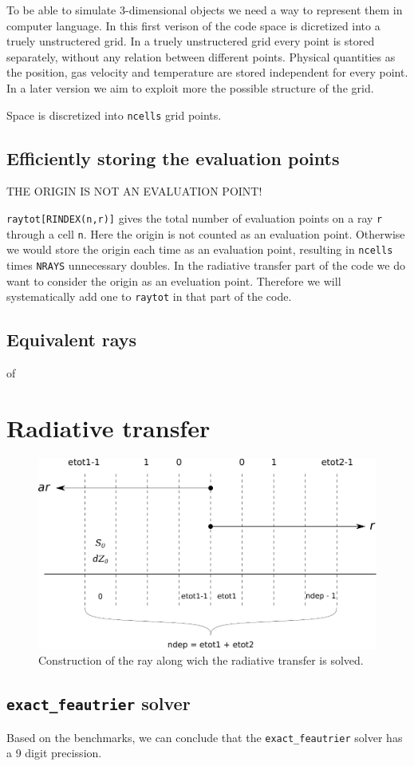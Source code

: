 \documentclass[]{article}
\begin{document}
To be able to simulate 3-dimensional objects we need a way to represent them in computer language. In this first verison of the code space is dicretized into a truely unstructered grid. In a truely unstructered grid every point is stored separately, without any relation between different points. Physical quantities as the position, gas velocity and temperature are stored independent for every point. In a later version we aim to exploit more the possible structure of the grid.

\bigskip

Space is discretized into \texttt{ncells} grid points.

\subsection{Efficiently storing the evaluation points}

THE ORIGIN IS NOT AN EVALUATION POINT!

\texttt{raytot[RINDEX(n,r)]} gives the total number of evaluation points on a ray \texttt{r} through a cell \texttt{n}. Here the origin is not counted as an evaluation point. Otherwise we would store the origin each time as an evaluation point, resulting in \texttt{ncells} times \texttt{NRAYS} unnecessary doubles. In the radiative transfer part of the code we do want to consider the origin as an eveluation point. Therefore we will systematically add one to \texttt{raytot} in that part of the code.

\subsection{Equivalent rays}
of

\section{Radiative transfer}

\begin{figure}[H]
	\centering
	\includegraphics[scale=.8]{Images/ray.pdf}
	\caption{Construction of the ray along wich the radiative transfer is solved.}
	\label{grid}
\end{figure}


\subsection{\texttt{exact\_feautrier} solver}

Based on the benchmarks, we can conclude that the \texttt{exact\_feautrier} solver has a 9 digit precission.


\newpage



\end{document}
